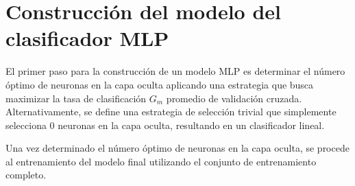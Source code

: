 %
%
%
\section{Construcción del modelo del clasificador MLP}
%
El primer paso para la construcción de un modelo MLP es determinar el
número óptimo de neuronas en la capa oculta aplicando una estrategia
que busca maximizar la tasa de clasificación $G_m$ promedio de
validación cruzada.
Alternativamente, se define una estrategia de selección trivial que
simplemente selecciona 0 neuronas en la capa oculta, resultando en un
clasificador lineal.

Una vez determinado el número óptimo de neuronas en la capa oculta,
se procede al entrenamiento del modelo final utilizando el conjunto
de entrenamiento completo.





